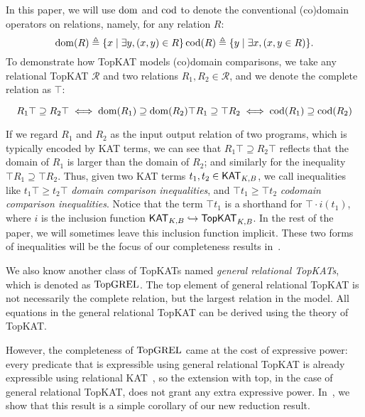 In this paper, 
we will use \(\operatorname{\mathrm{dom}}\) and \(\operatorname{\mathrm{cod}}\) to denote the 
conventional (co)domain operators on relations, namely, for any relation \(R\):
\[
    \operatorname{\mathrm{dom}}(R)  \triangleq  \{x  \mid   \exists  y, (x, y)  \in  R\} \\
    \operatorname{\mathrm{cod}}(R)  \triangleq  \{y  \mid   \exists  x, (x, y  \in  R)\}.
\]
To demonstrate how TopKAT models (co)domain comparisons,
we take any relational TopKAT \(\mathcal{R}\) and two relations \(R_{1}, R_{2}  \in  \mathcal{R}\),
and we denote the complete relation as \( \top \):
\begin{lemma}\label{the: TopKAT encodes domain PRIMITIVE}
    \[
        R_{1}  \top   \supseteq  R_{2}  \top   \iff  \operatorname{\mathrm{dom}}(R_{1})  \supseteq  \operatorname{\mathrm{dom}}(R_{2}) \\
         \top  R_{1}  \supseteq   \top  R_{2}  \iff  \operatorname{\mathrm{cod}}(R_{1})  \supseteq  \operatorname{\mathrm{cod}}(R_{2})
    \]
\end{lemma}
If we regard \(R_{1}\) and \(R_{2}\) as the input output relation of two programs,
which is typically encoded by KAT terms,
we can see that \(R_{1}  \top   \supseteq  R_{2}  \top \) reflects that  
the domain of \(R_{1}\) is larger than the domain of \(R_{2}\);
and similarly for the inequality \( \top  R_{1}  \supseteq   \top  R_{2}\).
Thus, given two KAT terms \(t_{1}, t_{2}  \in  \mathsf{KAT}_{K, B}\), we call inequalities like
\(t_{1}  \top   \geq  t_{2}  \top \) \emph{domain comparison inequalities},
and \( \top  t_{1}  \geq   \top  t_{2}\) \emph{codomain comparison inequalities}.
Notice that the term \( \top  t_{1}\) is a shorthand for \( \top   \cdot  i(t_{1})\),
where \(i\) is the inclusion function \(\mathsf{KAT}_{K, B}  \hookrightarrow  \mathsf{TopKAT}_{K, B}\).
In the rest of the paper, we will sometimes leave this inclusion function implicit.
These two forms of inequalities will be the focus of 
our completeness results in~.

We also know another class of TopKATs named \emph{general relational TopKATs},
which is denoted as \(\mathbf{\mathrm{TopGREL}}\).
The top element of general relational TopKAT is not necessarily the complete relation,
but the largest relation in the model.
All equations in the general relational TopKAT can be derived using the theory of TopKAT.

However, the completeness of \(\mathbf{\mathrm{TopGREL}}\) came at the cost of expressive power:
every predicate that is expressible using general relational TopKAT 
is already expressible using relational KAT~\cite{Zhang_de_Amorim_Gaboardi_2022},
so the extension with top, in the case of general relational TopKAT, 
does not grant any extra expressive power.
In~, 
we show that this result is a simple corollary of our new reduction result.

